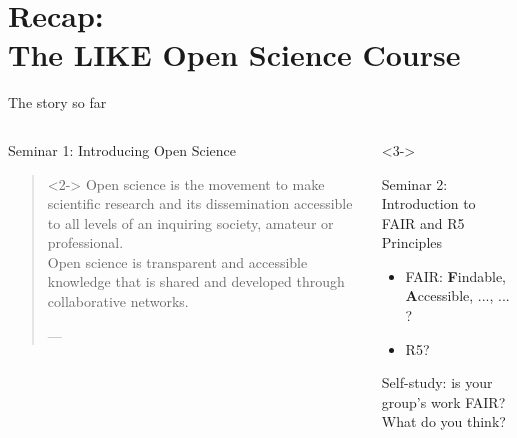 \section[The course]{Recap:\\ The LIKE Open Science Course}
\label{sec:course}

\begin{frame}{The story so far}

\begin{columns}
    \begin{column}{.45\textwidth}
    \begin{block}{Seminar 1: Introducing Open Science}
        \begin{quotation}<2->
        Open science is the movement to make scientific research and its dissemination accessible to all levels of an inquiring society, amateur or professional. \\
        Open science is transparent and accessible knowledge that is shared and developed through collaborative networks.
        \begin{flushright}
            \tiny{---}
        \end{flushright}
        \end{quotation}
    \end{block}
    
    \end{column}
    
    \begin{column}{.45\textwidth}<3->
        \begin{block}{Seminar 2: Introduction to FAIR and R5 Principles}
            \begin{itemize}
                \item FAIR: \textbf{F}indable, \textbf{A}ccessible, ..., ... ?
                \item R5?
            \end{itemize}
        \end{block}
        
        \begin{block}{Self-study: is your group's work FAIR?}
        What do you think?
        \end{block}
    
    
    \end{column}
    
\end{columns}

\end{frame}


